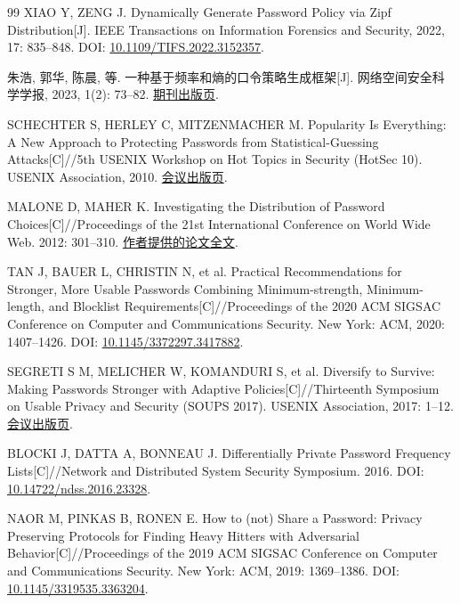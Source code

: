 \documentclass{crypto_report}
\begin{document}
\begin{thebibliography}{99}
 XIAO Y, ZENG J. Dynamically Generate Password Policy via Zipf
Distribution{[}J{]}. IEEE Transactions on Information Forensics and
Security, 2022, 17: 835--848. DOI:
\href{https://doi.org/10.1109/TIFS.2022.3152357}{10.1109/TIFS.2022.3152357}.

 朱浩, 郭华, 陈晨, 等. 一种基于频率和熵的口令策略生成框架{[}J{]}.
网络空间安全科学学报, 2023, 1(2): 73--82.
\href{https://www.journalofcybersec.com/EN/Y2023/V1/I2/73}{期刊出版页}.

 SCHECHTER S, HERLEY C, MITZENMACHER M. Popularity Is Everything: A New Approach to Protecting Passwords from Statistical-Guessing Attacks[C]//5th USENIX Workshop on Hot Topics in Security (HotSec 10). USENIX Association, 2010. \href{https://www.usenix.org/conference/hotsec10/popularity-everything-new-approach-protecting-passwords-statistical-guessing}{会议出版页}.

 MALONE D, MAHER K. Investigating the Distribution of Password Choices[C]//Proceedings of the 21st International Conference on World Wide Web. 2012: 301--310.
\href{https://www.maths.tcd.ie/~dwmalone/p/www2012.pdf}{作者提供的论文全文}.

 TAN J, BAUER L, CHRISTIN N, et al. Practical Recommendations for Stronger, More Usable Passwords Combining Minimum-strength, Minimum-length, and Blocklist Requirements[C]//Proceedings of the 2020 ACM SIGSAC Conference on Computer and Communications Security. New York: ACM, 2020: 1407--1426. DOI: \href{https://doi.org/10.1145/3372297.3417882}{10.1145/3372297.3417882}.

 SEGRETI S M, MELICHER W, KOMANDURI S, et al. Diversify to Survive: Making Passwords Stronger with Adaptive Policies[C]//Thirteenth Symposium on Usable Privacy and Security (SOUPS 2017). USENIX Association, 2017: 1--12. \href{https://www.usenix.org/conference/soups2017/technical-sessions/presentation/segreti}{会议出版页}.

 BLOCKI J, DATTA A, BONNEAU J. Differentially Private Password Frequency Lists{[}C{]}//Network and Distributed System Security Symposium. 2016. DOI:
\href{https://doi.org/10.14722/ndss.2016.23328}{10.14722/ndss.2016.23328}.

 NAOR M, PINKAS B, RONEN E. How to (not) Share a Password: Privacy Preserving Protocols for Finding Heavy Hitters with Adversarial Behavior[C]//Proceedings of the 2019 ACM SIGSAC Conference on Computer and Communications Security. New York: ACM, 2019: 1369--1386. DOI: \href{https://doi.org/10.1145/3319535.3363204}{10.1145/3319535.3363204}.


\end{thebibliography}
\end{document}
